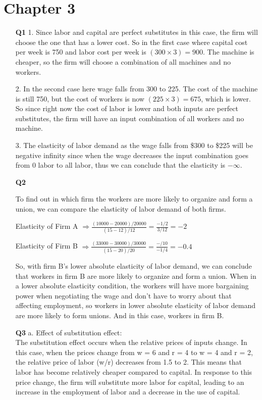 \documentclass[12pt]{article}
\begin{document}
\section{Chapter 3}
\begin{enumerate}
    \item[\textbf{Q1}]
    1. Since labor and capital are perfect substitutes in this case, the firm will choose the one that has a lower cost. So in the first case where capital cost per week is 750 and labor cost per week is $(300 \times 3) = 900$. The machine is cheaper, so the firm will choose a combination of all machines and no workers.

    2. In the second case here wage falls from 300 to 225. The cost of the machine is still 750, but the cost of workers is now $(225 \times 3) = 675$, which is lower. So since right now the cost of labor is lower and both inputs are perfect substitutes, the firm will have an input combination of all workers and no machine.

    3. The elasticity of labor demand as the wage falls from \$300 to \$225 will be negative infinity since when the wage decreases the input combination goes from 0 labor to all labor, thus we can conclude that the elasticity is $-\infty$.

    \item[\textbf{Q2}] 

    To find out in which firm the workers are more likely to organize and form a union, we can compare the elasticity of labor demand of both firms.

    Elasticity of Firm A
    $\Rightarrow \frac{(10000 - 20000)/20000}{(15 - 12)/12} = \frac{-1/2}{3/12} = -2$

    Elasticity of Firm B
    $\Rightarrow \frac{(33000 - 30000)/30000}{(15 - 20)/20} = \frac{-/10}{-1/4} = -0.4$ 

    So, with firm B's lower absolute elasticity of labor demand, we can conclude that workers in firm B are more likely to organize and form a union. When in a lower absolute elasticity condition, the workers will have more bargaining power when negotiating the wage and don't have to worry about that affecting employment, so workers in lower absolute elasticity of labor demand are more likely to form unions. And in this case, workers in firm B.

    \item[\textbf{Q3}] 
    a.  Effect of substitution effect: \\
    The substitution effect occurs when the relative prices of inputs change. In this case, when the prices change from w = 6 and r = 4 to w = 4 and r = 2, the relative price of labor (w/r) decreases from 1.5 to 2. This means that labor has become relatively cheaper compared to capital. In response to this price change, the firm will substitute more labor for capital, leading to an increase in the employment of labor and a decrease in the use of capital.
    

\end{enumerate}
\end{document}
